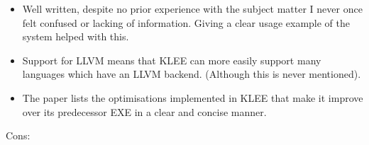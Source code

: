 \documentclass[11pt]{article}
\begin{document}
\begin{itemize}

    \item Well written, despite no prior experience with the subject matter I
    never once felt confused or lacking of information. Giving a clear usage
    example of the system helped with this.

    \item Support for LLVM means that KLEE can more easily support many
    languages which have an LLVM backend. (Although this is never mentioned).


    \item The paper lists the optimisations implemented in KLEE that make it
    improve over its predecessor EXE \cite{EXE} in a clear and concise manner.

\end{itemize}

Cons:
\end{document}
